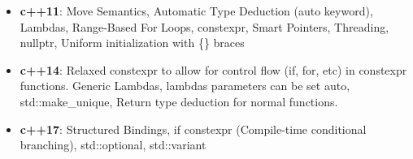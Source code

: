 \documentclass{report}
\begin{document}
\pagebreak 
{}
\begin{itemize}
    \item \textbf{c++11}: Move Semantics, Automatic Type Deduction (auto keyword), Lambdas, Range-Based For Loops, constexpr, Smart Pointers, Threading, nullptr, Uniform initialization with \{\} braces
    \item \textbf{c++14}: Relaxed constexpr to allow for control flow (if, for, etc) in constexpr functions. Generic Lambdas, lambdas parameters can be set auto, std::make\_unique, Return type deduction for normal functions.
    \item \textbf{c++17}: Structured Bindings, if constexpr (Compile-time conditional branching), std::optional, std::variant
\end{itemize}

























    
\end{document}
